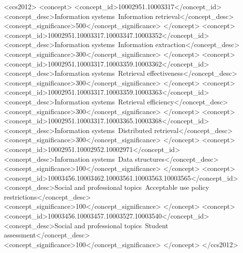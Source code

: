 \begin{CCSXML}
  <ccs2012>
  <concept>
  <concept_id>10002951.10003317</concept_id>
  <concept_desc>Information systems~Information retrieval</concept_desc>
  <concept_significance>500</concept_significance>
  </concept>
  <concept>
  <concept_id>10002951.10003317.10003347.10003352</concept_id>
  <concept_desc>Information systems~Information extraction</concept_desc>
  <concept_significance>300</concept_significance>
  </concept>
  <concept>
  <concept_id>10002951.10003317.10003359.10003362</concept_id>
  <concept_desc>Information systems~Retrieval effectiveness</concept_desc>
  <concept_significance>300</concept_significance>
  </concept>
  <concept>
  <concept_id>10002951.10003317.10003359.10003363</concept_id>
  <concept_desc>Information systems~Retrieval efficiency</concept_desc>
  <concept_significance>300</concept_significance>
  </concept>
  <concept>
  <concept_id>10002951.10003317.10003365.10003368</concept_id>
  <concept_desc>Information systems~Distributed retrieval</concept_desc>
  <concept_significance>300</concept_significance>
  </concept>
  <concept>
  <concept_id>10002951.10002952.10002971</concept_id>
  <concept_desc>Information systems~Data structures</concept_desc>
  <concept_significance>100</concept_significance>
  </concept>
  <concept>
  <concept_id>10003456.10003462.10003561.10003563.10003565</concept_id>
  <concept_desc>Social and professional topics~Acceptable use policy restrictions</concept_desc>
  <concept_significance>100</concept_significance>
  </concept>
  <concept>
  <concept_id>10003456.10003457.10003527.10003540</concept_id>
  <concept_desc>Social and professional topics~Student assessment</concept_desc>
  <concept_significance>100</concept_significance>
  </concept>
  </ccs2012>
\end{CCSXML}

